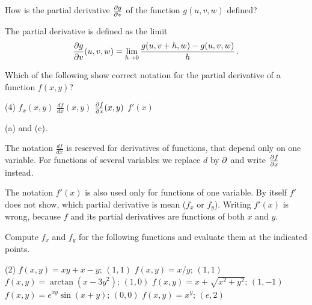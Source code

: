 \begin{question}
How is the partial derivative $\frac{\partial g}{\partial v}$ of the function $g(u, v, w)$ defined?
\end{question}

\begin{solution}
The partial derivative is defined as the limit
\[
\frac{\partial g}{\partial v}(u, v, w) = \lim_{h \to 0} \frac{g(u, v + h, w) - g(u, v, w)}{h}\,.
\]
\end{solution}

\begin{question}
Which of the following show correct notation for the partial derivative of a function $f(x,y)$?
\begin{tasks}(4)
\task
$f_x(x,y)$
\task
$\frac{df}{dx}(x,y)$
\task
$\frac{\partial f}{\partial x}(x,y)$
\task
$f'(x)$
\end{tasks}
\end{question}

\begin{solution}
(a) and (c).

The notation $\frac{d f}{dx}$ is reserved for derivatives of functions, that depend only on one variable. For functions of several variables we replace $d$ by $\partial$ and write $\frac{\partial f}{\partial x}$ instead.

The notation $f'(x)$ is also used only for functions of one variable. By itself $f'$ does not show, which partial derivative is mean ($f_x$ or $f_y$). Writing $f'(x)$ is wrong, because $f$ and its partial derivatives are functions of both $x$ and $y$.
\end{solution}

\begin{question}
Compute $f_x$ and $f_y$ for the following functions and evaluate them at the indicated points.
\begin{tasks}(2)
\task
$f(x,y) = xy + x -y;\, (1,1)$
\task
$f(x,y) = x/y;\, (1,1)$
\task
$f(x,y) = \arctan(x-3y^2);\, (1,0)$
\task
$f(x,y) = x + \sqrt{x^2+y^2};\, (1,-1)$
\task
$f(x,y) = e^{xy}\sin(x+y);\, (0,0)$
\task
$f(x,y) = x^y;\, (e,2)$
\end{tasks}
\end{question}

